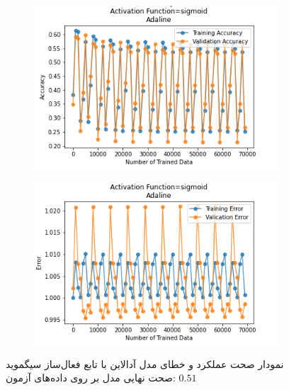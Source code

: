 \documentclass[12pt, a4paper]{article}
\begin{document}
\vspace{1cm}

\begin{figure}[h]
    \begin{subfigure}{0.45\linewidth}
        \centering
        \includegraphics[width=\linewidth]{images/5/adaline/activation_func/sigmoid_acc.png}
    \end{subfigure}
    \hfil
    \begin{subfigure}{0.45\linewidth}
        \centering
        \includegraphics[width=\linewidth]{images/5/adaline/activation_func/sigmoid_error.png}
    \end{subfigure}
    \caption{نمودار صحت عملکرد‌ و خطای مدل آدالاین با تابع فعال‌ساز سیگموید
    \newline
    صحت نهایی مدل بر روی داده‌های آزمون: $0.51$}
\end{figure}
\end{document}
